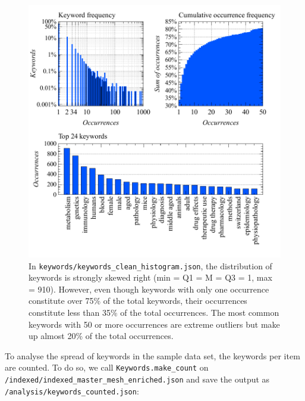 \begin{figure}
\centering
\includegraphics{images/keywords_clean_histogram_abc.pdf}
\caption{In \texttt{keywords/keywords\_clean\_histogram.json}, the
distribution of keywords is strongly skewed right (min = Q1 = M = Q3 =
1, max = 910). However, even though keywords with only one occurrence
constitute over 75\% of the total keywords, their occurrences constitute
less than 35\% of the total occurrences. The most common keywords with
50 or more occurrences are extreme outliers but make up almost 20\% of
the total occurrences.}
\end{figure}

To analyse the spread of keywords in the sample data set, the keywords
per item are counted. To do so, we call \texttt{Keywords.make\_count} on
\texttt{/indexed/indexed\_master\_mesh\_enriched.json} and save the
output as \texttt{/analysis/keywords\_counted.json}:

\begin{Shaded}
\begin{Highlighting}[]
\OperatorTok{=}\OperatorTok{+} \NormalTok{)}
\OperatorTok{=}
\OperatorTok{+} \NormalTok{)}
\end{Highlighting}
\end{Shaded}

